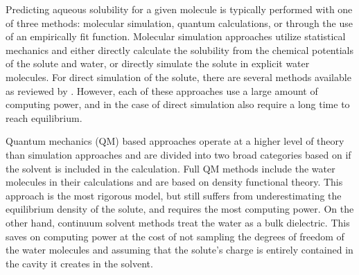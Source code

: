 \documentclass[journal=jmcmar,manuscript=article]{achemso}
\begin{document}
Predicting aqueous solubility for a given molecule is typically performed with one of three methods: molecular simulation, quantum calculations, or through the use of an empirically fit function.
Molecular simulation approaches utilize statistical mechanics and either directly calculate the solubility from the chemical potentials of the solute and water\cite{denseStates}, or directly simulate the solute in explicit water molecules.
For direct simulation of the solute, there are several methods available as reviewed by \citet{solrev1}.
However, each of these approaches use a large amount of computing power, and in the case of direct simulation also require a long time to reach equilibrium.

Quantum mechanics (QM) based approaches operate at a higher level of theory than simulation approaches and are divided into two broad categories based on if the solvent is included in the calculation. 
Full QM methods include the water molecules in their calculations and are based on density functional theory\cite{solrev1}.
This approach is the most rigorous model, but still suffers from underestimating the equilibrium density of the solute\cite{solrev1}, and requires the most computing power.
On the other hand, continuum solvent methods treat the water as a bulk dielectric.
This saves on computing power at the cost of not sampling the degrees of freedom of the water molecules and assuming that the solute's charge is entirely contained in the cavity it creates in the solvent.
\end{document}
